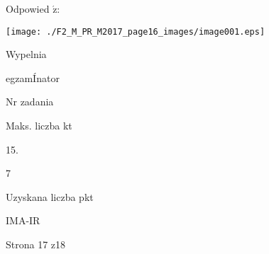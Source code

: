 \documentclass[a4paper,12pt]{article}
\begin{document}
Odpowied $\acute{\mathrm{z}}$:
\begin{center}
\texttt{[image: ./F2\_M\_PR\_M2017\_page16\_images/image001.eps]}
\end{center}
Wypelnia

egzamÍnator

Nr zadania

Maks. liczba kt

15.

7

Uzyskana liczba pkt

IMA-IR

Strona 17 z18
\end{document}
